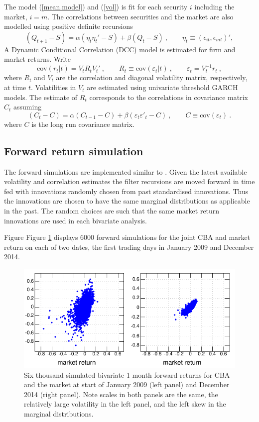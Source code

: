 \documentclass[authoryear]{elsarticle}
\newcommand{\cov}{\mathrm{cov}}
\newcommand{\eps}{\epsilon}
\newcommand{\eref}[1]{(\ref{#1})}
\newcommand{\fref}[1]{Figure \ref{#1}}
\newcommand{\cq}{\ , \qquad}
\begin{document}
The model \eref{mean.model} and \eref{vol} is fit  for each security $i$ including the market,  $i=m$.   The correlations between securities and the market are also modelled using  positive definite recursions   \citep{engle2002dynamic}
$$
(Q_{t+1}-S) = \alpha (\eta_t\eta_t'-S) + \beta (Q_t-S)\cq \eta_t\equiv(\eps_{it},\eps_{mt})' ,
$$
A   Dynamic Conditional Correlation (DCC) model is estimated for  firm and market returns.  Write
\newcommand{\veps}{\varepsilon}
$$
\cov (r_t|t) = V_tR_tV_t'\cq R_t\equiv \cov(\veps_t|t)\cq \veps_t=V_t^{-1}r_t\ ,
$$
where $R_t$ and  $V_t$  are the correlation and diagonal volatility matrix, respectively, at time $t$.   Volatilities in $V_t$  are estimated using univariate threshold GARCH models.  The estimate of $R_t$ corresponds to the correlations in covariance matrix $C_t$ assuming
$$
(C_t - C) = \alpha (C_{t-1}-C)+\beta (\veps_t\veps'_t-C) \cq C\equiv\cov(\veps_t)\ .
$$
where $C$ is the long run covariance matrix.

\subsection{Forward return simulation}

The forward simulations are implemented similar to \cite{brownlees2015}.   Given the latest available volatility and correlation estimates the filter recursions are moved forward in time fed with innovations randomly chosen from past standardised innovations.  Thus the innovations are chosen to have the same marginal distributions as applicable in the past.  The random choices are such  that the same market return innovations are used in each bivariate analysis.   

Figure \fref{simulation} displays  6000 forward simulations for the joint CBA and market return on each of  two dates, the first trading days in January 2009 and December 2014. 

\begin{figure}[htbp]
\begin{center}
\includegraphics{simulation.pdf}
\caption{Six thousand simulated bivariate 1 month forward returns for CBA and the market at start of January 2009 (left panel)  and December 2014 (right panel). Note scales in both panels are the same, the relatively large volatility in the left panel, and the left skew in the  marginal distributions.}
\label{simulation}
\end{center}
\end{figure}
\end{document}
